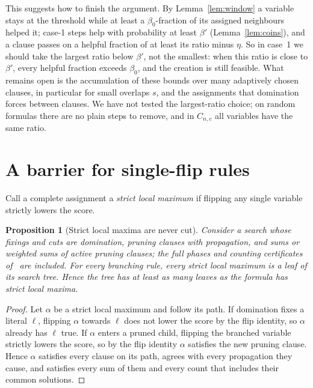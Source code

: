 \documentclass[11pt,a4paper]{article}
\newtheorem{proposition}[theorem]{Proposition}
\theoremstyle{remark}
\begin{document}
This suggests how to finish the argument. By Lemma~\ref{lem:window} a variable
stays at the threshold while at least a $\beta_0$-fraction of its assigned
neighbours helped it; case-1 steps help with probability at least $\beta'$
(Lemma~\ref{lem:coins}), and a clause passes on a helpful fraction of at least
its ratio minus $\eta$. So in case~1 we should take the largest ratio below
$\beta'$, not the smallest: when this ratio is close to $\beta'$, every helpful
fraction exceeds $\beta_0$, and the creation is still feasible. What remains
open is the accumulation of these bounds over many adaptively chosen clauses,
in particular for small overlaps $s$, and the assignments that domination forces
between clauses. We have not tested the largest-ratio choice; on random
formulas there are no plain steps to remove, and in $C_{n,c}$ all variables have
the same ratio.

\section{A barrier for single-flip rules}\label{sec:barrier}

Call a complete assignment a \emph{strict local maximum} if flipping any single
variable strictly lowers the score.

\begin{proposition}[Strict local maxima are never cut]\label{prop:barrier}
Consider a search whose fixings and cuts are domination, pruning clauses with
propagation, and sums or weighted sums of active pruning clauses; the full
phases and counting certificates of~\cite{N5} are included. For every branching
rule, every strict local maximum is a leaf of its search tree. Hence the tree
has at least as many leaves as the formula has strict local maxima.
\end{proposition}

\begin{proof}
Let $\alpha$ be a strict local maximum and follow its path. If domination fixes
a literal $\ell$, flipping $\alpha$ towards $\ell$ does not lower the score by
the flip identity, so $\alpha$ already has $\ell$ true. If $\alpha$ enters a
pruned child, flipping the branched variable strictly lowers the score, so by
the flip identity $\alpha$ satisfies the new pruning clause. Hence $\alpha$
satisfies every clause on its path, agrees with every propagation they cause,
and satisfies every sum of them and every count that includes their common
solutions.
\end{proof}
\end{document}
